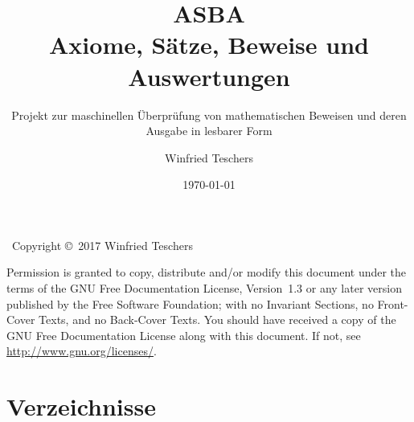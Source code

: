 \titlehead{
	{\Large Dr. Winfried Teschers}\\
	Anton-Günther-Straße 26c\\91083 Baiersdorf\\
	{\footnotesize winfried.teschers@t-online.de}
}
\subject{Projektdokument}
\title{{\Huge ASBA}\\Axiome, Sätze, Beweise und Auswertungen}
\subtitle{Projekt zur maschinellen Überprüfung von mathematischen Beweisen und deren Ausgabe in lesbarer Form}
\author{Winfried Teschers}
\date{\today}
\publishers{\vspace{1cm}\normalsize
	Es wird ein Programmsystem beschrieben, das zu eingegebenen Axiomen, Sätzen, und Beweisen letztere prüft, Auswertungen generiert und zu gegebenen Ausgabeschemata eine Ausgabe der Elemente in üblicher Formelschreibweise im \LaTeX-Format erstellt.
}



	\maketitle

	~\vfill Copyright \copyright\ 2017 Winfried Teschers\bigskip

	Permission is granted to copy, distribute and/or modify this document under the terms of the GNU Free Documentation License, Version~1.3 or any later version published by the Free Software Foundation; with no Invariant Sections, no Front-Cover Texts, and no Back-Cover Texts.
	You should have received a copy of the GNU Free Documentation License along with this document.
	If not, see \url{http://www.gnu.org/licenses/}.

	\tableofcontents
	\Endchapter

	
	
	
	
	

	\chapter{Verzeichnisse}%
	\label{cha:Verzeichnisse}

	\likechapter[section]{\listtablename}
	\begin{minipage}{\linewidth-10.95pt}
		\label{dic:Tabellenverzeichnis}
		\listoftables
	\end{minipage}
	\Endchapter

